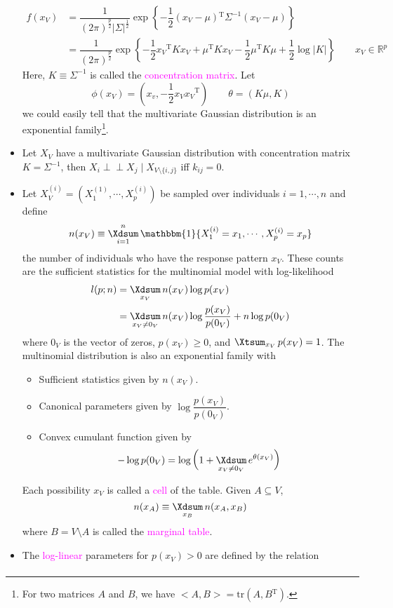 \documentclass[UTF8]{book}
\DeclareMathOperator*{\Xsum}{\mathchoice{\Xdsum}{\Xtsum}{\Xtsum}{\Xtsum}}
\newcommand{\perpp}{\ensuremath{\perp\!\!\!\!\!\perp}}
\newcommand{\et}{&}
\newcommand{\concept}[1]{\textcolor{magenta}{#1}}
\renewcommand{\t}{\ensuremath{^\mathrm{T}}}
\begin{document}
\begin{itemize}
\begin{align*}
	f(x_V) \et = \dfrac{1}{(2\pi)^{\frac{p}{2}}|\Sigma|^{\frac{1}{2}}}\exp\left\{-\dfrac{1}{2}(x_V-\mu)\t\Sigma^{-1}(x_V-\mu)\right\}\\
	\et = \dfrac{1}{(2\pi)^{\frac{p}{2}}}\exp\left\{-\dfrac{1}{2}x_V\t Kx_V + \mu\t Kx_V - \dfrac{1}{2}\mu\t K\mu + \dfrac{1}{2}\log |K|\right\} \qquad x_V\in\mathbb{R}^p
\end{align*}
Here, $K\equiv\Sigma^{-1}$ is called the \concept{concentration matrix}. Let 
$$
\phi(x_V) = \left(x_v, -\dfrac{1}{2}x_Vx_V\t\right) \qquad \theta = (K\mu ,K)
$$
we could easily tell that the multivariate Gaussian distribution is an exponential family\footnote{For two matrices $A$ and $B$, we have $<A,B>=\mathrm{tr}(A,B\t)$.}.
\item Let $X_V$ have a multivariate Gaussian distribution with concentration matrix $K=\Sigma^{-1}$, then $X_i\perpp X_j\mid X_{V\setminus\{i,j\}}$ iff $k_{ij} = 0$.
\item Let $X_V^{(i)}=(X_1^{(1)},\cdots,X_p^{(i)})$ be sampled over individuals $i=1,\cdots , n$ and define
$$
n(x_V) \equiv \Xsum_{i=1}^n\mathbbm{1}\{X_1^{(i)}=x_1,\cdots,X_p^{(i)}=x_p\}
$$
the number of individuals who have the response pattern $x_V$. These counts are the sufficient statistics for the multinomial model with log-likelihood
\begin{align*}
	l(p; n)\et = \Xsum_{x_V}n(x_V)\log p(x_V)\\
	\et = \Xsum_{x_V\neq 0_V} n(x_V)\log\dfrac{p(x_V)}{p(0_V)} +n\log p(0_V)
\end{align*}
where $0_V$ is the vector of zeros, $p(x_V)\geq 0$, and $\Xsum_{x_V}p(x_V)=1$. The multinomial distribution is also an exponential family with
\begin{itemize}
	\item Sufficient statistics given by $n(x_V)$.
	\item Canonical parameters given by $\log\dfrac{p(x_V)}{p(0_V)}$.
	\item Convex cumulant function given by
	$$
		-\log p(0_V) = \log\left(1+\Xsum_{x_V\neq 0_V}e^{\theta (x_V)}\right)	
	$$
\end{itemize}
Each possibility $x_V$ is called a \concept{cell} of the table. Given $A\subseteq V$, 
$$
n(x_A)\equiv \Xsum_{x_B}n(x_A,x_B)
$$
where $B=V\setminus A$ is called the \concept{marginal table}.
\item The \concept{log-linear} parameters for $p(x_V)>0$ are defined by the relation
\begin{align*}

\end{align*}
\end{itemize}
\end{document}
